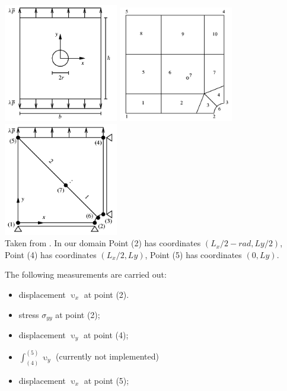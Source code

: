 \begin{center}
\includegraphics[width=5cm]{python_codes/fieldstone_124/images/rarr03a}
\includegraphics[width=5cm]{python_codes/fieldstone_124/images/rarr03c}
\includegraphics[width=5cm]{python_codes/fieldstone_124/images/rarr03f}\\
{\captionfont Taken from \textcite{rarr03}. In our domain 
Point (2) has coordinates $(L_x/2-rad,Ly/2)$,
Point (4) has coordinates $(L_x/2,Ly)$,
Point (5) has coordinates $(0,Ly)$.}
\end{center}

The following measurements are carried out:
\begin{itemize}
\item displacement $\upupsilon_x$ at point (2).
\item stress $\sigma_{yy}$  at point (2);
\item displacement $\upupsilon_y$ at point (4);
\item $\int_{(4)}^{(5)} \upupsilon_y$ (currently not implemented) 
\item displacement $\upupsilon_x$ at point (5);
\end{itemize}

